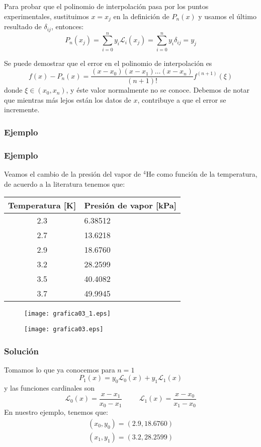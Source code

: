 \begin{frame}
Para probar que el polinomio de interpolación pasa por los puntos experimentales, sustituimos $x=x_{j}$ en la definición de $P_{n}(x)$ y usamos el último resultado de $\delta_{ij}$, entonces:
\[ P_{n}(x_{j}) = \sum_{i=0}^{n} y_{i}\mathcal{L}_{i}(x_{j}) = \sum_{i=0}^{n} y_{i} \delta_{ij} = y_{j} \]
\end{frame}
\begin{frame}
Se puede demostrar que el error en el polinomio de interpolación es
\[ f(x) - P_{n}(x) = \dfrac{(x-x_{0})(x-x_{1})\ldots(x-x_{n})}{(n+1)!} f^{(n+1)}(\xi)\]
donde $\xi \in (x_{0},x_{n})$, y éste valor normalmente no se conoce. Debemos de notar que mientras más lejos están los datos de $x$, contribuye a que el error se incremente. 
\end{frame}
\subsubsection{Ejemplo}
\begin{frame}
\frametitle{Ejemplo}
Veamos el cambio de la presión del vapor de {}$^{4}$He como función de la temperatura, de acuerdo a la literatura tenemos que:
\fontsize{12}{12}\selectfont
\begin{center}
\begin{tabular}{c | l@{}}
Temperatura [K] & Presión de vapor [kPa] \\
\hline 2.3 & 6.38512 \\
\hline 2.7 & 13.6218 \\
\hline 2.9 & 18.6760 \\
\hline 3.2 & 28.2599 \\
\hline 3.5 & 40.4082 \\
\hline 3.7 & 49.9945
\end{tabular}
\end{center}
\end{frame}
\begin{frame}
\begin{figure}
	\centering
	\texttt{[image: grafica03\_1.eps]} 
\end{figure}
\end{frame}
\begin{frame}
\begin{figure}
	\centering
	\texttt{[image: grafica03.eps]} 
\end{figure}
\end{frame}
\begin{frame}[fragile]
\frametitle{Solución}
Tomamos lo que ya conocemos para $n=1$
\[P_{1}(x) = y_{0}\mathcal{L}_{0}(x) + y_{1} \mathcal{L}_{1}(x) \]
y las funciones cardinales son
\[ \mathcal{L}_{0}(x) = \dfrac{x-x_{1}}{x_{0}-x_{1}} \hspace{1cm} \mathcal{L}_{1}(x) = \dfrac{x-x_{0}}{x_{1}-x_{0}} \]
En nuestro ejemplo, tenemos que:
\begin{eqnarray*}
(x_{0}, y_{0}) = (2.9, 18.6760) \\
(x_{1}, y_{1}) = (3.2, 28.2599)
\end{eqnarray*}
\end{frame}
